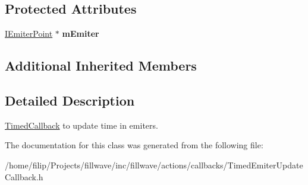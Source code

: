 \subsection*{Protected Attributes}
\begin{DoxyCompactItemize}
\item 
\hyperlink{classflw_1_1flf_1_1IEmiterPoint}{I\+Emiter\+Point} $\ast$ {\bfseries m\+Emiter}\hypertarget{classflw_1_1flf_1_1TimedEmiterUpdateCallback_ad5a0616f07c27103ab4d65ada50b8e42}{}\label{classflw_1_1flf_1_1TimedEmiterUpdateCallback_ad5a0616f07c27103ab4d65ada50b8e42}

\end{DoxyCompactItemize}
\subsection*{Additional Inherited Members}


\subsection{Detailed Description}
\hyperlink{classflw_1_1flf_1_1TimedCallback}{Timed\+Callback} to update time in emiters. 

The documentation for this class was generated from the following file\+:\begin{DoxyCompactItemize}
\item 
/home/filip/\+Projects/fillwave/inc/fillwave/actions/callbacks/Timed\+Emiter\+Update\+Callback.\+h\end{DoxyCompactItemize}
